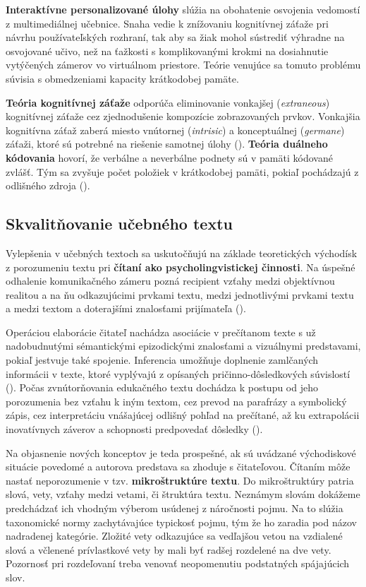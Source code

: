 \textbf{Interaktívne personalizované úlohy} slúžia na obohatenie osvojenia vedomostí z multimediálnej učebnice. Snaha vedie k znížovaniu kognitívnej záťaže pri návrhu používateľských rozhraní, tak aby sa žiak mohol sústrediť výhradne na osvojované učivo, než na ťažkosti s komplikovanými krokmi na dosiahnutie vytýčených zámerov vo virtuálnom priestore. Teórie venujúce sa tomuto problému súvisia s obmedzeniami kapacity krátkodobej pamäte.

\textbf{Teória kognitívnej záťaže} odporúča eliminovanie vonkajšej (\emph{extraneous}) kognitívnej záťaže cez zjednodušenie kompozície zobrazovaných prvkov. Vonkajšia kognitívna záťaž zaberá miesto vnútornej (\emph{intrisic}) a konceptuálnej (\emph{germane}) záťaži, ktoré sú potrebné na riešenie samotnej úlohy (\cite{uhercik_vyznam_2012}). \textbf{Teória duálneho kódovania} hovorí, že verbálne a neverbálne podnety sú v pamäti kódované zvlášť. Tým sa zvyšuje počet položiek v krátkodobej pamäti, pokiaľ pochádzajú z odlišného zdroja (\cite{mishra_interactive_2005}).

\subsection{Skvalitňovanie učebného textu}
Vylepšenia v učebných textoch sa uskutočňujú na základe teoretických východísk z porozumeniu textu pri \textbf{čítaní ako psycholingvistickej činnosti}. Na úspešné odhalenie komunikačného zámeru pozná recipient vzťahy medzi objektívnou realitou a na ňu odkazujúcimi prvkami textu, medzi jednotlivými prvkami textu a medzi textom a doterajšími znalosťami prijímateľa (\cite{gavora_ziak_1992}). 

Operáciou elaborácie čitateľ nachádza asociácie v prečítanom texte s už nadobudnutými sémantickými epizodickými znalosťami a vizuálnymi predstavami, pokiaľ jestvuje také spojenie. Inferencia umožňuje doplnenie zamlčaných informácii v texte, ktoré vyplývajú z opísaných pričinno-dôsledkových súvislostí (\cite{gavora_ziak_1992}). Počas zvnútorňovania edukačného textu dochádza k postupu od jeho porozumenia bez vzťahu k iným textom, cez prevod na parafrázy a symbolický zápis, cez interpretáciu vnášajúcej odlišný pohľad na prečítané, až ku extrapolácii inovatívnych záverov a schopnosti predpovedať dôsledky (\cite{gavora_ziak_1992}). 

Na objasnenie nových konceptov je teda prospešné, ak sú uvádzané východiskové situácie povedomé a autorova predstava sa zhoduje s čitateľovou. Čítaním môže nastať neporozumenie v tzv. \textbf{mikroštruktúre textu}. Do mikroštruktúry patria slová, vety, vzťahy medzi vetami, či štruktúra textu. Neznámym slovám dokážeme predchádzať ich vhodným výberom usúdenej z náročnosti pojmu. Na to slúžia taxonomické normy zachytávajúce typickosť pojmu, tým že ho zaradia pod názov nadradenej kategórie. Zložité vety odkazujúce sa vedľajšou vetou na vzdialené slová a včlenené prívlastkové vety by mali byť radšej rozdelené na dve vety. Pozornosť pri rozdeľovaní treba venovať neopomenutiu podstatných spájajúcich slov. 

